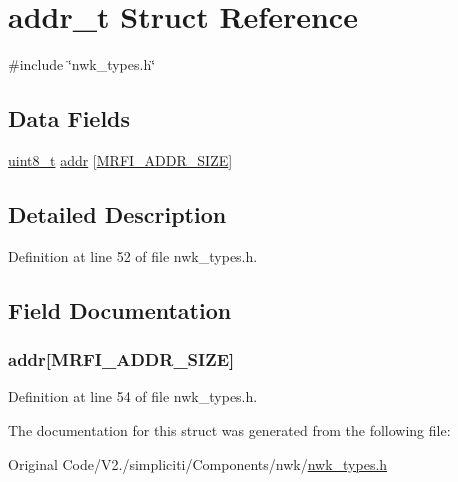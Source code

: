 \hypertarget{structaddr__t}{\section{addr\-\_\-t \-Struct \-Reference}
\label{structaddr__t}
}


{\ttfamily \#include \char`\"{}nwk\-\_\-types.\-h\char`\"{}}

\subsection*{\-Data \-Fields}
\begin{DoxyCompactItemize}
\item 
\hyperlink{bsp__msp430__defs_8h_aba7bc1797add20fe3efdf37ced1182c5}{uint8\-\_\-t} \hyperlink{structaddr__t_a774858e8a0bebe3dc06db9e8e64b2051}{addr} \mbox{[}\hyperlink{mrfi_8h_a5491e55db4c46a461c9e86faa9e0a9b1}{\-M\-R\-F\-I\-\_\-\-A\-D\-D\-R\-\_\-\-S\-I\-Z\-E}\mbox{]}
\end{DoxyCompactItemize}


\subsection{\-Detailed \-Description}


\-Definition at line 52 of file nwk\-\_\-types.\-h.



\subsection{\-Field \-Documentation}
\hypertarget{structaddr__t_a774858e8a0bebe3dc06db9e8e64b2051}{
\subsubsection[{addr}]{ {\bf addr}\mbox{[}{\bf \-M\-R\-F\-I\-\_\-\-A\-D\-D\-R\-\_\-\-S\-I\-Z\-E}\mbox{]}}}\label{structaddr__t_a774858e8a0bebe3dc06db9e8e64b2051}


\-Definition at line 54 of file nwk\-\_\-types.\-h.



\-The documentation for this struct was generated from the following file\-:\begin{DoxyCompactItemize}
\item 
\-Original Code/\-V2./simpliciti/\-Components/nwk/\hyperlink{nwk__types_8h}{nwk\-\_\-types.\-h}\end{DoxyCompactItemize}
